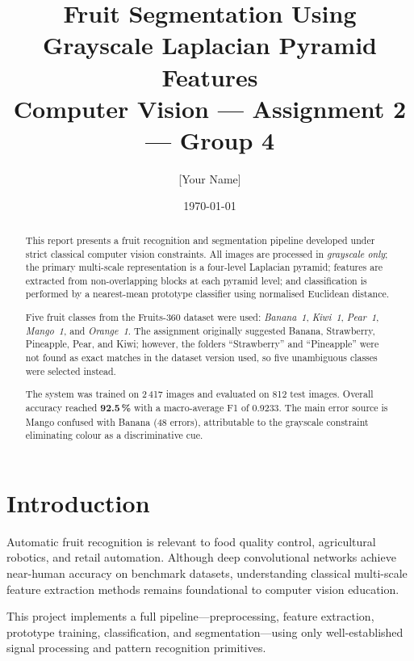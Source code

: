 \documentclass[11pt,a4paper]{article}
\title{%
  \textbf{Fruit Segmentation Using Grayscale Laplacian Pyramid Features}\\[0.4em]
  \large Computer Vision --- Assignment 2 --- Group 4
}
\author{[Your Name]}
\date{\today}
\begin{document}

\maketitle
\tableofcontents
\newpage

\begin{abstract}
This report presents a fruit recognition and segmentation pipeline developed
under strict classical computer vision constraints.  All images are processed
in \emph{grayscale only}; the primary multi-scale representation is a
four-level Laplacian pyramid; features are extracted from non-overlapping
blocks at each pyramid level; and classification is performed by a
nearest-mean prototype classifier using normalised Euclidean distance.

Five fruit classes from the Fruits-360 dataset were used: \textit{Banana~1},
\textit{Kiwi~1}, \textit{Pear~1}, \textit{Mango~1}, and \textit{Orange~1}.
The assignment originally suggested Banana, Strawberry, Pineapple, Pear, and
Kiwi; however, the folders ``Strawberry'' and ``Pineapple'' were not found as
exact matches in the dataset version used, so five unambiguous classes were
selected instead.

The system was trained on 2\,417 images and evaluated on 812 test images.
Overall accuracy reached \textbf{92.5\,\%} with a macro-average F1 of
0.9233.  The main error source is Mango confused with Banana (48 errors),
attributable to the grayscale constraint eliminating colour as a discriminative
cue.
\end{abstract}

\section{Introduction}

Automatic fruit recognition is relevant to food quality control, agricultural
robotics, and retail automation.  Although deep convolutional networks achieve
near-human accuracy on benchmark datasets, understanding classical multi-scale
feature extraction methods remains foundational to computer vision education.

This project implements a full pipeline---preprocessing, feature extraction,
prototype training, classification, and segmentation---using only well-established
signal processing and pattern recognition primitives.
\end{document}
